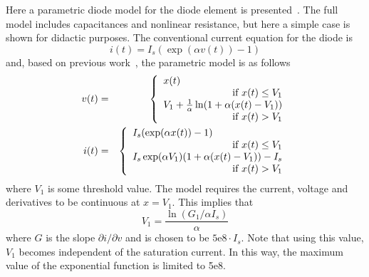 Here a parametric diode model for the diode element is
presented~\cite{rizzoli:92:1}. The full model includes capacitances
and nonlinear resistance, but here a simple case is shown for didactic
purposes.  The conventional current equation for the diode is
\begin{equation}
  i(t) = I_s (\exp(\alpha v(t)) - 1) \label{eq_dio1}
\end{equation}
and, based on previous work~\cite{rizzoli:92:1}, the parametric model
is as follows
%
\begin{eqnarray}
  v(t) & = & \left\{ \begin{array}{l}
	x(t)            \\
          \multicolumn{1}{r}{\mbox{if $x(t) \leq V_1$}}  \\
	V_1+\frac{1}{\alpha} \ln(1 + \alpha (x(t) - V_1)) \\
	  \multicolumn{1}{r}{\mbox{if $x(t) > V_1$}}
  \end{array} \right. \\
  i(t) & = & \left\{ \begin{array}{l}
	I_s (\exp(\alpha x(t)) - 1) \\
          \multicolumn{1}{r}{\mbox{if $x(t) \leq V_1$}}  \\
	I_s \exp(\alpha V_1) (1 + \alpha (x(t)-V_1)) - I_s \\
	  \multicolumn{1}{r}{\mbox{if $x(t) > V_1$}}
  \end{array} \right. 
\end{eqnarray}
%
where $V_1$ is some threshold value. The model requires the current,
voltage and derivatives to be continuous at $x = V_1$. This implies
that
%
\begin{equation}
  V_1 = \frac{\ln ( G_1 / \alpha I_s )}{\alpha}
\end{equation}
%
where $G$ is the slope $\partial i / \partial v$ and is chosen to be
$\mbox{5e8} \cdot I_s$. Note that using this value, $V_1$ becomes
independent of the saturation current. In this way, the maximum value
of the exponential function is limited to 5e8.

